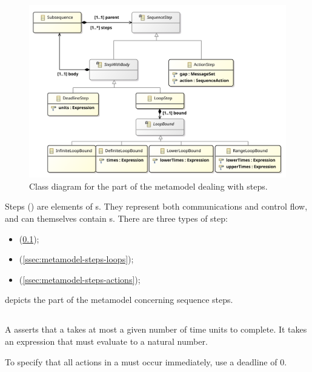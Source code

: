 \begin{figure}[htb]
	\centering
	\includegraphics[width=\textwidth]{diagrams/Steps}
	\caption{Class diagram for the part of the \langname{} metamodel dealing with steps.}
	\label{fig:metamodel-steps}
\end{figure}

\noindent
Steps (\msequencestep) are elements of
\msubsequence s.  They represent both communications and control flow, and
can themselves contain \msubsequence s.  There are three types of
step:

\begin{itemize}
\item \mdeadlinestep{} (\cref{ssec:metamodel-steps-deadlines});
\item \mloopstep{} (\cref{ssec:metamodel-steps-loops});
\item \mactionstep{} (\cref{ssec:metamodel-steps-actions});
\end{itemize}

 depicts the part of the metamodel concerning
sequence steps.

\subsection{\mdeadlinestep}\label{ssec:metamodel-steps-deadlines}

A \mdeadlinestep{} asserts that a \msubsequence{} takes at most
a given number of time units to complete.
It takes an expression that must
evaluate to a natural number.

\begin{remark}
To specify that all actions in a \msubsequence{} must occur
immediately, use a deadline of \(0\).
\end{remark}


